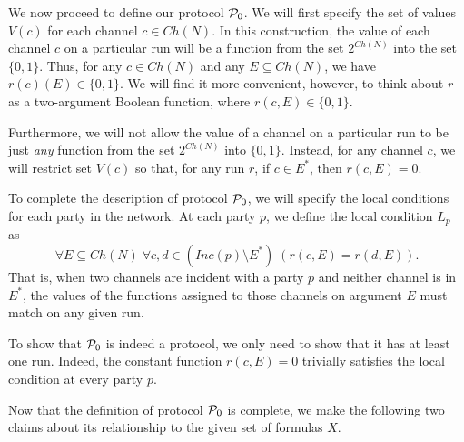 \documentclass{llncs}
\newcommand{\pp}{{\cal P}}
\begin{document}
We now proceed to define our protocol $\pp_0$.  We will first specify the set of values $V(c)$ for each channel $c \in Ch(N)$.  In this construction, the value of each channel $c$ on a particular run will be a function from the set $2^{Ch(N)}$ into the set $\{0,1\}$. 
Thus, for any $c\in Ch(N)$ and any $E\subseteq Ch(N)$, we have $r(c)(E)\in \{0,1\}$. 
We will find it more convenient, however, to think about $r$ as a two-argument Boolean function, where $r(c,E)\in \{0,1\}$. 

Furthermore, we will not allow the value of a channel on a particular run to be just {\it any} function from the set $2^{Ch(N)}$ into $\{0,1\}$.  Instead, for any channel $c$, we will restrict set $V(c)$ so that, for any run $r$, if $c\in E^*$, then $r(c,E)=0$. 


To complete the description of protocol $\pp_0$, we will specify the local conditions for each party in the network.
At each party $p$, we define the local condition $L_p$ as
$$\forall E\subseteq Ch(N)\; \forall c,d\in (Inc(p)\setminus E^*)\;  \left(r(c, E)=r(d, E)\right).$$
That is, when two channels are incident with a party $p$ and neither channel is in $E^*$, the values of the functions assigned to those channels on argument $E$ must match on any given run.

To show that $\pp_0$ is indeed a protocol, we only need to show that it has at least one run. Indeed, 
the constant function $r(c,E)=0$ trivially satisfies the local condition at every party $p$.

Now that the definition of protocol $\pp_0$ is complete, we make the following two claims about its relationship to the given set of formulas $X$.
\end{document}
